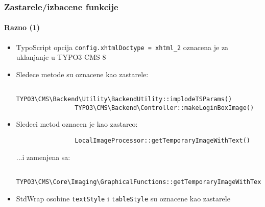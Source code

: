 \begin{frame}[fragile]
	\frametitle{Zastarele/izbacene funkcije}
	\framesubtitle{Razno (1)}

	\begin{itemize}
		\item TypoScript opcija \texttt{config.xhtmlDoctype = xhtml\_2} oznacena je za uklanjanje u TYPO3 CMS 8

		\item Sledece metode su oznacene kao zastarele:
			\begin{lstlisting}
				TYPO3\CMS\Backend\Utility\BackendUtility::implodeTSParams()
				TYPO3\CMS\Backend\Controller::makeLoginBoxImage()
			\end{lstlisting}

		\item Sledeci metod oznacen je kao zastareo:
			\begin{lstlisting}
				LocalImageProcessor::getTemporaryImageWithText()
			\end{lstlisting}

			...i zamenjena sa:

			\begin{lstlisting}
				TYPO3\CMS\Core\Imaging\GraphicalFunctions::getTemporaryImageWithText()
			\end{lstlisting}

		\item StdWrap osobine \texttt{textStyle} i \texttt{tableStyle} su oznacene kao zastarele

	\end{itemize}

\end{frame}


